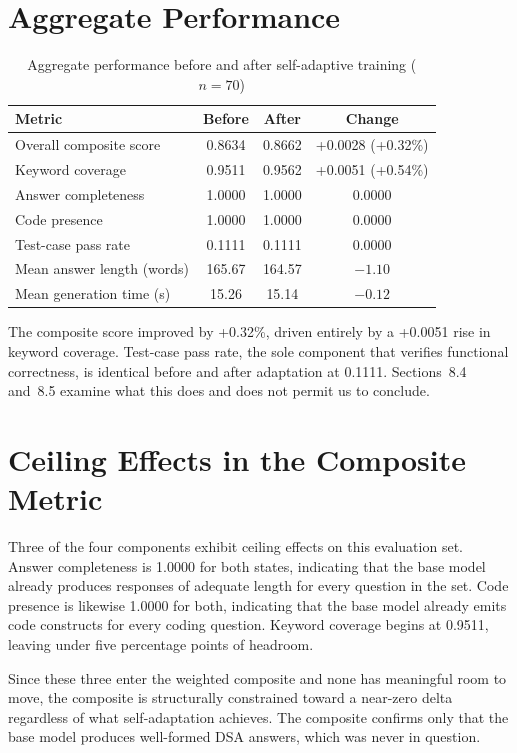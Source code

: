 \documentclass[12pt,a4paper]{report}
\begin{document}
\section{Aggregate Performance}

\begin{table}[htbp]
\centering
\caption{Aggregate performance before and after self-adaptive training ($n = 70$)}
\begin{tabular}{>{\raggedright\arraybackslash}p{5cm} c c c}
\toprule
\textbf{Metric} & \textbf{Before} & \textbf{After} & \textbf{Change} \\
\midrule
Overall composite score & 0.8634 & 0.8662 & +0.0028 (+0.32\%) \\
Keyword coverage & 0.9511 & 0.9562 & +0.0051 (+0.54\%) \\
Answer completeness & 1.0000 & 1.0000 & 0.0000 \\
Code presence & 1.0000 & 1.0000 & 0.0000 \\
Test-case pass rate & 0.1111 & 0.1111 & 0.0000 \\
Mean answer length (words) & 165.67 & 164.57 & $-1.10$ \\
Mean generation time (s) & 15.26 & 15.14 & $-0.12$ \\
\bottomrule
\end{tabular}
\end{table}

The composite score improved by +0.32\%, driven entirely by a +0.0051 rise in keyword coverage. Test-case pass rate, the sole component that verifies functional correctness, is identical before and after adaptation at 0.1111. Sections~8.4 and~8.5 examine what this does and does not permit us to conclude.

\section{Ceiling Effects in the Composite Metric}

Three of the four components exhibit ceiling effects on this evaluation set. Answer completeness is 1.0000 for both states, indicating that the base model already produces responses of adequate length for every question in the set. Code presence is likewise 1.0000 for both, indicating that the base model already emits code constructs for every coding question. Keyword coverage begins at 0.9511, leaving under five percentage points of headroom.

Since these three enter the weighted composite and none has meaningful room to move, the composite is structurally constrained toward a near-zero delta regardless of what self-adaptation achieves. The composite confirms only that the base model produces well-formed DSA answers, which was never in question.
\end{document}
